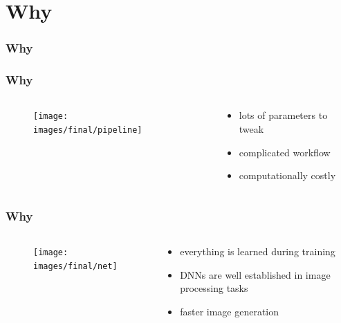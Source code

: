 \documentclass[18pt, xcolor=table]{beamer}
\begin{document}
\section{Why}

\begin{frame}[t]
  \frametitle{Why}
\end{frame}

\begin{frame}
  \frametitle{Why}
  \begin{columns}[t]
    \begin{column}{0.5\textwidth}
      \vspace{-0.5cm}
      \begin{center}
        \begin{figure}[htb]
          \texttt{[image: images/final/pipeline]}
        \end{figure}
      \end{center}
    \end{column}
    \begin{column}{0.5\textwidth}
      \begin{itemize}
      \item lots of parameters to tweak
      \item complicated workflow
      \item computationally costly
      \end{itemize}
    \end{column}
  \end{columns}
\end{frame}

\begin{frame}
  \frametitle{Why}
  \begin{columns}[t]
    \begin{column}{0.5\textwidth}
      \vspace{-0.5cm}
      \begin{center}
        \begin{figure}[htb]
          \texttt{[image: images/final/net]}
        \end{figure}
      \end{center}
    \end{column}
    \begin{column}{0.5\textwidth}
      \begin{itemize}
      \item everything is learned during training
      \item DNNs are well established in image processing tasks
      \item faster image generation
      \end{itemize}
    \end{column}
  \end{columns}
\end{frame}
\end{document}
